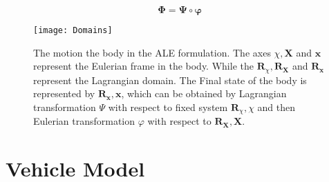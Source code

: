 \begin{equation}\label{eq:ALE_Transformation}
     \boldsymbol{\Phi} = \boldsymbol{\Psi} \circ \boldsymbol{\varphi}
\end{equation}

\begin{figure}[!ht]
    \centering
    \texttt{[image: Domains]}
    \caption{The motion the body in the ALE formulation. The axes $\chi, \mathbf{X}$ and $\mathbf{x}$ represent the Eulerian frame in the body. While the $\mathbf{R}_{\chi}, \mathbf{R}_{\mathbf{X}}$ and $\mathbf{R}_{\mathbf{x}}$ represent the Lagrangian domain. The Final state of the body is represented by $\mathbf{R}_{\mathbf{x}}, \mathbf{x}$, which can be obtained by Lagrangian transformation $\Psi$ with respect to fixed system $\mathbf{R}_{\chi}, \chi$ and then Eulerian transformation $\varphi$ with respect to $\mathbf{R}_{\mathbf{X}}, \mathbf{X}$.}
    \label{fig:ALEdomain}
\end{figure}

\section{Vehicle Model}
